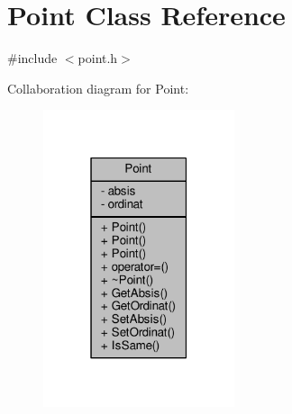 \hypertarget{classPoint}{}\section{Point Class Reference}
\label{classPoint}


{\ttfamily \#include $<$point.\+h$>$}



Collaboration diagram for Point\+:
\nopagebreak
\begin{figure}[H]
\begin{center}
\leavevmode
\includegraphics[width=159pt]{classPoint__coll__graph}
\end{center}
\end{figure}
